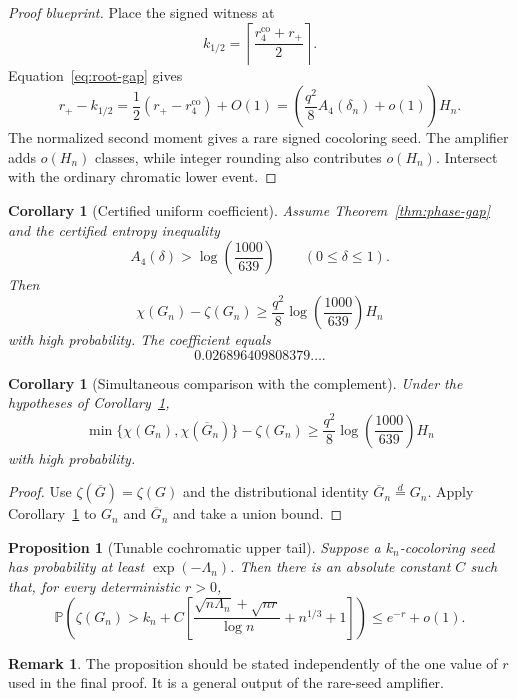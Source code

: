 \documentclass[11pt]{article}
\newtheorem{proposition}[theorem]{Proposition}
\newtheorem{corollary}[theorem]{Corollary}
\theoremstyle{definition}
\newtheorem{remark}[theorem]{Remark}
\newcommand{\Pp}{\mathbb P}
\newcommand{\Afour}{A_4}
\newcommand{\rplus}{r_+}
\newcommand{\rco}{r_4^{\mathrm{co}}}
\begin{document}
\begin{proof}[Proof blueprint]
Place the signed witness at
\[
 k_{1/2}=\left\lceil\frac{\rco+\rplus}{2}\right\rceil.
\]
Equation~\eqref{eq:root-gap} gives
\[
 \rplus-k_{1/2}
 =\frac12(\rplus-\rco)+O(1)
 =\left(\frac{q^2}{8}\Afour(\delta_n)+o(1)\right)H_n.
\]
The normalized second moment gives a rare signed cocoloring seed.  The
amplifier adds $o(H_n)$ classes, while integer rounding also contributes
$o(H_n)$.  Intersect with the ordinary chromatic lower event.
\end{proof}

\begin{corollary}[Certified uniform coefficient]
\label{cor:uniform}
Assume Theorem~\ref{thm:phase-gap} and the certified entropy inequality
\[
 \Afour(\delta)>\log\!\left(\frac{1000}{639}\right)
 \qquad(0\le\delta\le1).
\]
Then
\[
 \chi(G_n)-\zeta(G_n)
 \ge
 \frac{q^2}{8}\log\!\left(\frac{1000}{639}\right)H_n
\]
with high probability.  The coefficient equals
\[
 0.026896409808379\ldots.
\]
\end{corollary}

\begin{corollary}[Simultaneous comparison with the complement]
\label{cor:complement}
Under the hypotheses of Corollary~\ref{cor:uniform},
\[
 \min\{\chi(G_n),\chi(\overline G_n)\}-\zeta(G_n)
 \ge
 \frac{q^2}{8}\log\!\left(\frac{1000}{639}\right)H_n
\]
with high probability.
\end{corollary}

\begin{proof}
Use $\zeta(\overline G)=\zeta(G)$ and the distributional identity
$\overline G_n\stackrel d=G_n$.  Apply Corollary~\ref{cor:uniform} to $G_n$
and $\overline G_n$ and take a union bound.
\end{proof}

\begin{proposition}[Tunable cochromatic upper tail]
\label{prop:tunable-tail}
Suppose a $k_n$-cocoloring seed has probability at least
$\exp(-\Lambda_n)$.  Then there is an absolute constant $C$ such that, for
every deterministic $r>0$,
\[
 \Pp\!\left(
 \zeta(G_n)>k_n+C\left[
  \frac{\sqrt{n\Lambda_n}+\sqrt{nr}}{\log n}+n^{1/3}+1
 \right]\right)
 \le e^{-r}+o(1).
\]
\end{proposition}

\begin{remark}
The proposition should be stated independently of the one value of $r$ used
in the final proof.  It is a general output of the rare-seed amplifier.
\end{remark}
\end{document}
